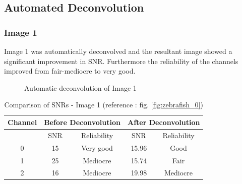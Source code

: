 \documentclass{article}
\begin{document}
\clearpage
\subsection*{Automated Deconvolution}
\subsubsection*{Image 1}
Image 1 was automatically deconvolved and the resultant image showed a significant improvement in SNR. Furthermore the reliability of the channels improved from fair-mediocre to very good.
\begin{figure}[h!]
\centering
{}
\vspace{5 mm}
\caption{Automatic deconvolution of Image 1}
\label{fig:auto-deconvolve-image1}
\end{figure}
\begin{table}[h!]
\centering
\caption{Comparison of SNRs - Image 1 (reference : fig. \ref{fig:zebrafish_0})}
\begin{tabular}{*5c}
\toprule
Channel &  \multicolumn{2}{c}{Before Deconvolution} & \multicolumn{2}{c}{After Deconvolution}\\
\midrule
{}   & SNR   & Reliability    & SNR   & Reliability \\
0   &  15 & Very good   & 15.96  & Good\\
1   &  25 & Mediocre & 15.74  & Fair\\
2   &  16  &  Mediocre & 19.98  & Mediocre\\
\bottomrule
\end{tabular}
\end{table}
\end{document}
